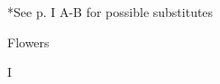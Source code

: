 \documentclass[a4paper,9pt]{article}
\begin{document}
\begin{minipage}{0.2\textwidth}
\color{red}
*See p. I A-B
for possible
substitutes
\end{minipage}
\begin{minipage}{0.3\textwidth}
\color{black}
 Flowers
\end{minipage}
\begin{minipage}{0.2\textwidth}
\color{red}
\newsavebox{\abc}
%
\begin{turn}{25}\usebox{\abc}\end{turn}
\end{minipage}
\begin{minipage}{0.1\textwidth}
\flushright
\color{red}
I
\end{minipage}
\end{document}
